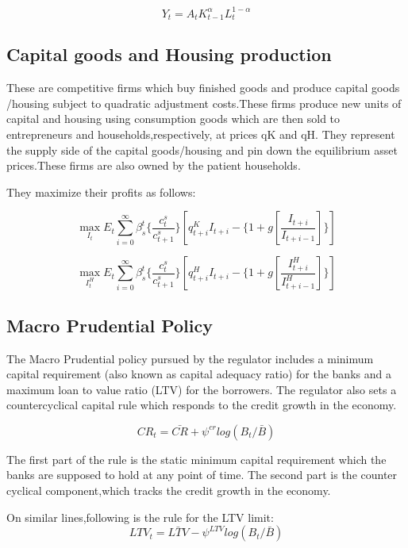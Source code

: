 \documentclass[12pt]{article}
\numberwithin{equation}{section}
\begin{document}
\begin{appendix}
\begin{equation}
Y_{t}=A_{t} K^{\alpha}_{t-1}L^{1-\alpha}_{t}
\end{equation}

\subsection*{Capital goods and Housing production}

These are competitive firms which buy finished goods and produce capital goods /housing subject to quadratic adjustment costs.These firms produce new units of capital and housing using consumption goods which are then sold to entrepreneurs and households,respectively, at prices qK and qH. They represent the supply side of the capital goods/housing and pin down the equilibrium asset prices.These firms are also owned by the patient households.

They maximize their profits as follows:

\begin{equation}
\max_{I_t}E_t\sum _{i=0}^{\infty } \beta_{s}^t\{ \frac{c^s_t}{c^s_{t+1}}\} [q^K_{t+i} I_{t+i}-\{1+g[\frac{I_{t+i}}{I_{t+i-1}}]\} ]
\end{equation}

\begin{equation}
\max_{I^H_t}E_t\sum _{i=0}^{\infty } \beta_{s}^t \{ \frac{c^s_t}{c^s_{t+1}}\} [q^H_{t+i} I_{t+i}-\{1+g[\frac{I^H_{t+i}}{I^H_{t+i-1}}]\} ]
\end{equation}



\subsection*{Macro Prudential Policy}

The Macro Prudential policy pursued by the regulator includes a minimum capital requirement (also known as capital adequacy ratio) for the banks and a maximum loan to value ratio (LTV) for the borrowers. The regulator also sets a countercyclical capital rule which responds to the credit growth in the economy.

\begin{equation}
CR_{t}={\bar{CR}}+ \psi^{cr} log( B_{t}/{\bar{B}})
\end{equation}

The first part of the rule is the static minimum capital requirement which the banks are supposed to hold at any point of time. The second part is the counter cyclical component,which tracks the credit growth in the economy.

On similar lines,following is the rule for the LTV limit: 
\begin{equation}
LTV_{t}={\bar{LTV}}- \psi^{LTV} log( B_{t}/{\bar{B}})
\end{equation}



\end{appendix}
\end{document}
